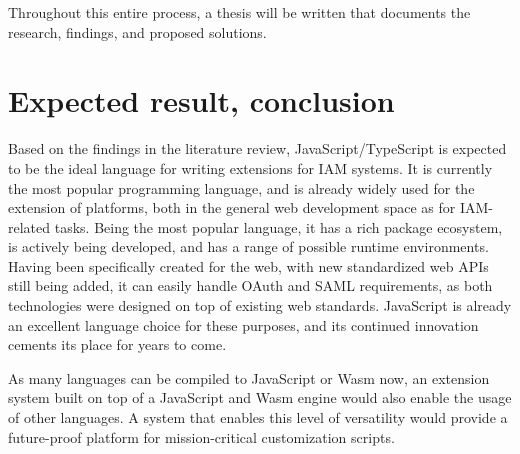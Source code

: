 Throughout this entire process, a thesis will be written that documents the research, findings, and proposed solutions.


\section{Expected result, conclusion}%
\label{sec:expected_results}

Based on the findings in the literature review, JavaScript/TypeScript is expected to be the ideal language for writing extensions for IAM systems. It is currently the most popular programming language, and is already widely used for the extension of platforms, both in the general web development space as for IAM-related tasks. Being the most popular language, it has a rich package ecosystem, is actively being developed, and has a range of possible runtime environments. Having been specifically created for the web, with new standardized web APIs still being added, it can easily handle OAuth and SAML requirements, as both technologies were designed on top of existing web standards. JavaScript is already an excellent language choice for these purposes, and its continued innovation cements its place for years to come.

As many languages can be compiled to JavaScript or Wasm now, an extension system built on top of a JavaScript and Wasm engine would also enable the usage of other languages. A system that enables this level of versatility would provide a future-proof platform for mission-critical customization scripts.

